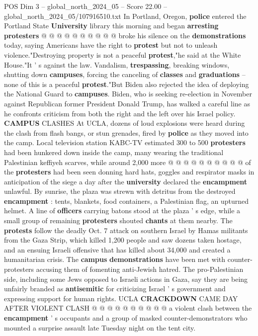 \begin{textsample}{POS Dim 3 – global\_north\_2024\_05 – Score 22.00 – global\_north\_2024\_05/107916510.txt}
In Portland, Oregon, \textbf{police} entered the Portland State \textbf{University} library this morning and began \textbf{arresting} \textbf{protesters} @ @ @ @ @ @ @ @ @ @ broke his silence on the \textbf{demonstrations} today, saying Americans have the right to \textbf{protest} but not to unleash violence."Destroying property is not a peaceful \textbf{protest},"he said at the White House."It ' s against the law.
Vandalism, \textbf{trespassing}, breaking windows, shutting down \textbf{campuses}, forcing the canceling of \textbf{classes} and \textbf{graduations} -- none of this is a peaceful \textbf{protest}."But Biden also rejected the idea of deploying the National Guard to \textbf{campuses}.
Biden, who is seeking re-election in November against Republican former President Donald Trump, has walked a careful line as he confronts criticism from both the right and the left over his Israel policy. \textbf{CAMPUS} CLASHES At UCLA, dozens of loud explosions were heard during the clash from flash bangs, or stun grenades, fired by \textbf{police} as they moved into the camp.
Local television station KABC-TV estimated 300 to 500 \textbf{protesters} had been hunkered down inside the camp, many wearing the traditional Palestinian keffiyeh scarves, while around 2,000 more @ @ @ @ @ @ @ @ @ @ of the \textbf{protesters} had been seen donning hard hats, goggles and respirator masks in anticipation of the siege a day after the \textbf{university} declared the \textbf{encampment} unlawful.
By sunrise, the plaza was strewn with detritus from the destroyed \textbf{encampment} : tents, blankets, food containers, a Palestinian flag, an upturned helmet.
A line of \textbf{officers} carrying batons stood at the plaza ' s edge, while a small group of remaining \textbf{protesters} shouted \textbf{chants} at them nearby.
The \textbf{protests} follow the deadly Oct. 7 attack on southern Israel by Hamas militants from the Gaza Strip, which killed 1,200 people and saw dozens taken hostage, and an ensuing Israeli offensive that has killed about 34,000 and created a humanitarian crisis.
The \textbf{campus} \textbf{demonstrations} have been met with counter-protesters accusing them of fomenting anti-Jewish hatred.
The pro-Palestinian side, including some Jews opposed to Israeli actions in Gaza, say they are being unfairly branded as \textbf{antisemitic} for criticizing Israel ' s government and expressing support for human rights.
UCLA \textbf{CRACKDOWN} CAME DAY AFTER VIOLENT CLASH @ @ @ @ @ @ @ @ @ @ a violent clash between the \textbf{encampment} ' s occupants and a group of masked counter-demonstrators who mounted a surprise assault late Tuesday night on the tent city.

\end{textsample}
